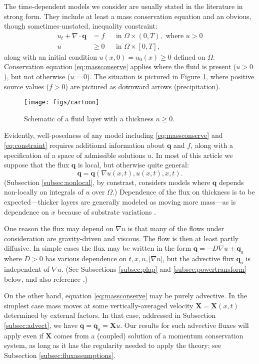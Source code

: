 \documentclass[final,onefignum]{siamart190516}
\newcommand\bq{\mathbf{q}}
\newcommand\bX{\mathbf{X}}
\newcommand{\Div}{\nabla\cdot}
\newcommand{\grad}{\nabla}
\begin{document}
The time-dependent models we consider are usually stated in the literature in strong form.  They include at least a mass conservation equation and an obvious, though sometimes-unstated, inequality constraint:
\begin{align}
u_t + \Div \bq &= f &&\text{in } \Omega \times (0,T), \text{ where } u > 0 \label{eq:massconserve} \\
u &\ge 0 &&\text{in } \Omega \times [0,T], \label{eq:constraint}
\end{align}
along with an initial condition $u(x,0)=u_0(x)\ge 0$ defined on $\Omega$.  Conservation equation \eqref{eq:massconserve} applies where the fluid is present ($u>0$), but not otherwise ($u=0$).  The situation is pictured in Figure \ref{fig:cartoon}, where positive source values ($f>0$) are pictured as downward arrows (precipitation).

\begin{figure}[ht]
\centerline{\texttt{[image: figs/cartoon]}}
\caption{Schematic of a fluid layer with a thickness $u\ge 0$.}
\label{fig:cartoon}
\end{figure}

Evidently, well-posedness of any model including \eqref{eq:massconserve} and \eqref{eq:constraint} requires additional information about $\bq$ and $f$, along with a specification of a space of admissible solutions $u$.  In most of this article we suppose that the flux $\bq$ is local, but otherwise quite general:
\begin{equation}
\bq = \bq(\grad u(x,t),u(x,t),x,t). \label{eq:fluxdepends}
\end{equation}
(Subsection \ref{subsec:nonlocal}, by constrast, considers models where $\bq$ depends non-locally on integrals of $u$ over $\Omega$.)  Dependence of the flux on thickness is to be expected---thicker layers are generally modeled as moving more mass---as is dependence on $x$ because of substrate variations \cite[for example]{Bueler2016}.

One reason the flux may depend on $\grad u$ is that many of the flows under consideration are gravity-driven and viscous.  The flow is then at least partly diffusive.  In simple cases the flux may be written in the form $\bq=- D \grad u + \bq_a$ where $D > 0$ has various dependence on $t,x,u,|\grad u|$, but the advective flux $\bq_a$ is independent of $\grad u$.  (See Subsections \ref{subsec:plap} and \ref{subsec:powertransform} below, and also reference \cite{Ockendonetal2003}.)

On the other hand, equation \eqref{eq:massconserve} may be purely advective.  In the simplest case mass moves at some vertically-averaged velocity $\bX=\bX(x,t)$ determined by external factors.  In that case, addressed in Subsection \ref{subsec:advect}, we have $\bq = \bq_a = \bX u$.  Our results for such advective fluxes will apply even if $\bX$ comes from a (coupled) solution of a momentum conservation system, as long as it has the regularity needed to apply the theory; see Subsection \ref{subsec:fluxassumptions}.
\end{document}
